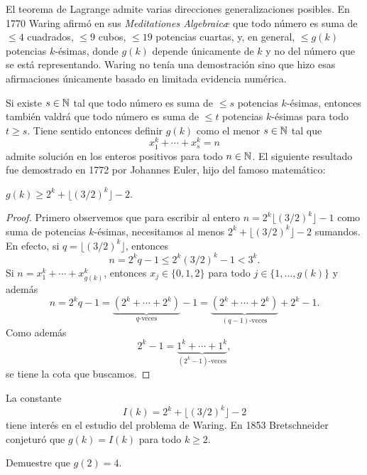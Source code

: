 El teorema de Lagrange admite varias direcciones generalizaciones posibles. En
1770 Waring afirmó en sus \emph{Meditationes Algebraic\ae} que todo número es
suma de $\leq 4$ cuadrados, $\leq 9$ cubos, $\leq 19$ potencias cuartas, y, en
general, $\leq g(k)$ potencias $k$-ésimas, donde $g(k)$ depende únicamente de
$k$ y no del número que se está representando. Waring no tenía una demostración
sino que hizo esas afirmaciones únicamente basado en limitada evidencia
numérica. 

Si existe $s\in\mathbb{N}$ tal que todo número es suma de $\leq s$ potencias
$k$-ésimas, entonces también valdrá que todo número es suma de $\leq t$
potencias $k$-ésimas para todo $t\geq s$. Tiene sentido entonces definir $g(k)$
como el menor $s\in\mathbb{N}$ tal que 
\[
	x_1^k+\cdots+x_s^k=n
\]
admite solución en los enteros positivos para todo $n\in\mathbb{N}$. El siguiente
resultado fue demostrado en 1772 por Johannes Euler, hijo del famoso
matemático: 

\begin{theorem}[Euler]
	$g(k)\geq 2^k+\lfloor (3/2)^k\rfloor-2$. 
\end{theorem}

\begin{proof}
	Primero observemos que para escribir al entero $n=2^k\lfloor
	(3/2)^k\rfloor-1$ como suma de potencias $k$-ésimas, necesitamos al menos
	$2^k+\lfloor (3/2)^k\rfloor-2$ sumandos. En efecto, si $q=\lfloor
	(3/2)^k\rfloor$, entonces
	\[
		n=2^kq-1\leq 2^k(3/2)^k-1<3^k.
	\]
	Si $n=x_1^k+\cdots+x_{g(k)}^k$, entonces $x_j\in\{0,1,2\}$ para todo
	$j\in\{1,\dots,g(k)\}$ y además 
	\[
		n=2^kq-1=\underbrace{(2^k+\cdots+2^k)}_{q\text{-veces}}-1=\underbrace{(2^k+\cdots+2^k)}_{(q-1)\text{-veces}}+2^k-1.
	\]
	Como además 
	\[
		2^k-1=\underbrace{1^k+\cdots+1^k}_{(2^k-1)\text{-veces}},
	\]
	se tiene la cota que buscamos.
\end{proof}

La constante 
\[
	I(k)=2^k+\lfloor (3/2)^k\rfloor-2 
\]
tiene interés en el estudio del problema de Waring. En 1853 Bretschneider
conjeturó que $g(k)=I(k)$ para todo $k\geq2$.

\begin{exercise}
	Demuestre que $g(2)=4$. 
\end{exercise}

